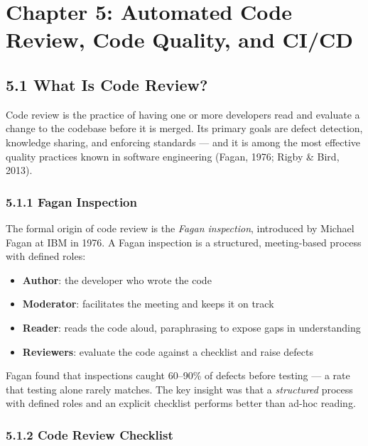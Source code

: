 \documentclass[11pt,a4paper]{book}
\begin{document}
\medskip


\chapter{Chapter 5: Automated Code Review, Code Quality, and CI/CD}

\medskip

\section{5.1 What Is Code Review?}

Code review is the practice of having one or more developers read and evaluate a change to the codebase before it is merged. Its primary goals are defect detection, knowledge sharing, and enforcing standards --- and it is among the most effective quality practices known in software engineering (Fagan, 1976; Rigby \& Bird, 2013).

\subsection{5.1.1 Fagan Inspection}

The formal origin of code review is the \textit{Fagan inspection}, introduced by Michael Fagan at IBM in 1976. A Fagan inspection is a structured, meeting-based process with defined roles:

\begin{itemize}
  \item \textbf{Author}: the developer who wrote the code
  \item \textbf{Moderator}: facilitates the meeting and keeps it on track
  \item \textbf{Reader}: reads the code aloud, paraphrasing to expose gaps in understanding
  \item \textbf{Reviewers}: evaluate the code against a checklist and raise defects
\end{itemize}

Fagan found that inspections caught 60--90\% of defects before testing --- a rate that testing alone rarely matches. The key insight was that a \textit{structured} process with defined roles and an explicit checklist performs better than ad-hoc reading.

\subsection{5.1.2 Code Review Checklist}
\end{document}
